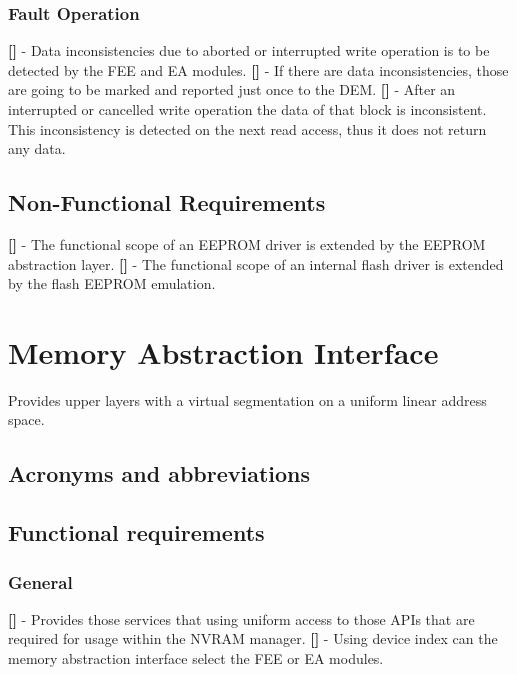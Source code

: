 \subsubsection{Fault Operation}
{\bf []} - Data inconsistencies due to aborted or interrupted write operation is to be detected by the FEE and EA modules.\newline
{\bf []} - If there are data inconsistencies, those are going to be marked and reported just once to the \mbox{DEM}. \newline
\newline
{\bf []} - After an interrupted or cancelled write operation the data of that block is inconsistent. This inconsistency is detected on the next read access, thus it does not return any data.

\subsection{Non-Functional Requirements}
{\bf []} - The functional scope of an EEPROM driver is extended by the EEPROM abstraction layer.\newline
\newline
{\bf []} - The functional scope of an internal flash driver is extended by the flash EEPROM emulation.

\newpage
\section{Memory Abstraction Interface}
Provides upper layers with a virtual segmentation on a uniform linear address space.
\subsection{Acronyms and abbreviations}
\subsection{Functional requirements}
\subsubsection{General}
{\bf []} - Provides those services that using uniform access to those APIs that are required for usage within the \mbox{NVRAM} manager.\newline
\newline
{\bf []} - Using device index can the memory abstraction interface select the FEE or EA modules.
